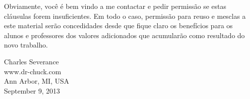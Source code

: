 
Obviamente, você é bem vindo a me contactar e pedir permissão se estas
cláusulas forem insuficientes. Em todo o caso, permissão para reuso e 
mesclas a este material serão concedidades desde que fique claro os
benefícios para os alunos e professores dos valores adicionados que acumularão
como resultado do novo trabalho.

Charles Severance\\
www.dr-chuck.com\\
Ann Arbor, MI, USA\\
September 9, 2013



\normalsize

\printindex

\clearemptydoublepage



